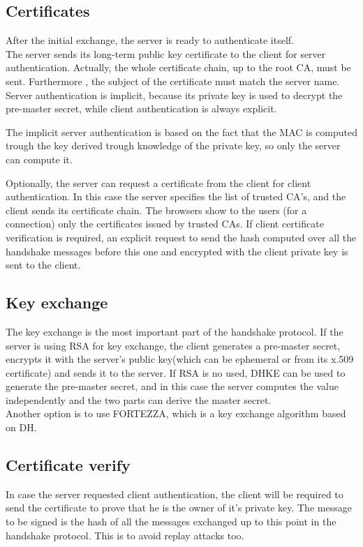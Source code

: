 \subsection{Certificates}
After the initial exchange, the server is ready to authenticate
itself.\\
The server sends its long-term public key certificate to the client
for server authentication. Actually, the whole certificate chain, up
to the root CA, must be sent. Furthermore , the subject of the 
certificate must match the server name.\\
Server authentication is implicit, because its private key is used to
decrypt the pre-master secret, while client authentication is 
always explicit.

\begin{boxH}
  The implicit server authentication is based on the fact that the MAC
  is computed trough the key derived trough knowledge of the private
  key, so only the server can compute it.
\end{boxH}

Optionally, the server can request a certificate from the client for
client authentication. In this case the server specifies the list of
trusted CA's, and the client sends its certificate chain. The browsers
show to the users (for a connection) only the certificates issued by
trusted CAs.
If client certificate verification is required, an explicit request to
send the hash computed over all the handshake messages before this 
one and encrypted with the client private key is sent to the client.

\subsection{Key exchange}
The key exchange is the most important part of the handshake protocol.
If the server is using RSA for key exchange, the client generates a
pre-master secret, encrypts it with the server's public key(which can
be ephemeral or from its x.509 certificate) and sends it to the
server. If RSA is no used, DHKE can be used to generate the pre-master
secret, and in this case the server computes the value independently 
and the two parts can derive the master secret.\\
Another option is to use FORTEZZA, which is a key exchange algorithm
based on DH.

\subsection{Certificate verify}
In case the server requested client authentication, the client will be
required to send the certificate to prove that he is the owner of it's
private key. The message to be signed is the hash of all the messages
exchanged up to this point in the handshake protocol. This is to avoid
replay attacks too.


